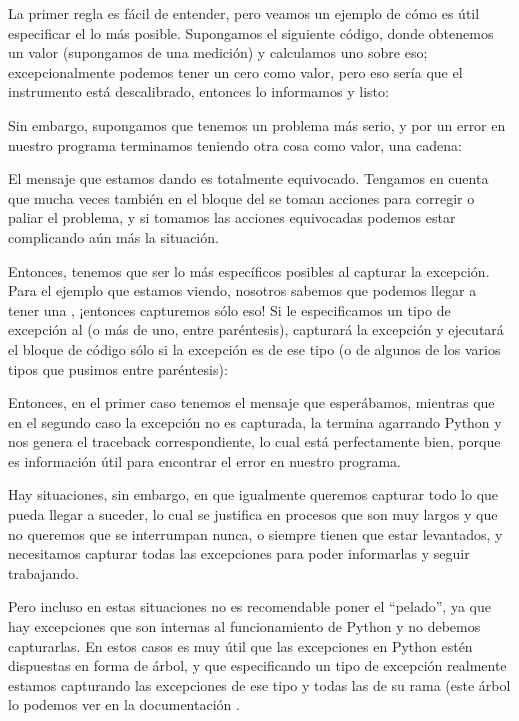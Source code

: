 La primer regla es fácil de entender, pero veamos un ejemplo de cómo es útil especificar el  lo más posible. Supongamos el siguiente código, donde obtenemos un valor (supongamos de una medición) y calculamos uno sobre eso; excepcionalmente podemos tener un cero como valor, pero eso sería que el instrumento está descalibrado, entonces lo informamos y listo:


Sin embargo, supongamos que tenemos un problema más serio, y por un error en nuestro programa terminamos teniendo otra cosa como valor, una cadena:


El mensaje que estamos dando es totalmente equivocado. Tengamos en cuenta que mucha veces también en el bloque del  se toman acciones para corregir o paliar el problema, y si tomamos las acciones equivocadas podemos estar complicando aún más la situación.

Entonces, tenemos que ser lo más específicos posibles al capturar la excepción. Para el ejemplo que estamos viendo, nosotros sabemos que podemos llegar a tener una , ¡entonces capturemos sólo eso! Si le especificamos un tipo de excepción al  (o más de uno, entre paréntesis), capturará la excepción y ejecutará el bloque de código sólo si la excepción es de ese tipo (o de algunos de los varios tipos que pusimos entre paréntesis):


Entonces, en el primer caso tenemos el mensaje que esperábamos, mientras que en el segundo caso la excepción no es capturada, la termina agarrando Python y nos genera el traceback correspondiente, lo cual está perfectamente bien, porque es información útil para encontrar el error en nuestro programa.

Hay situaciones, sin embargo, en que igualmente queremos capturar todo lo que pueda llegar a suceder, lo cual se justifica en procesos que son muy largos y que no queremos que se interrumpan nunca, o siempre tienen que estar levantados, y necesitamos capturar todas las excepciones para poder informarlas y seguir trabajando. 

Pero incluso en estas situaciones no es recomendable poner el  ``pelado'', ya que hay excepciones que son internas al funcionamiento de Python y no debemos capturarlas. En estos casos es muy útil que las excepciones en Python estén dispuestas en forma de árbol, y que especificando un tipo de excepción realmente estamos capturando las excepciones de ese tipo y todas las de su rama (este árbol lo podemos ver en la documentación \cite{stdlib_exceptree}. 

